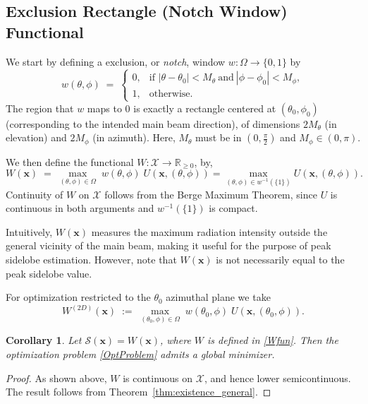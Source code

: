 \documentclass[11pt,letterpaper]{article}
\theoremstyle{definition}
\theoremstyle{plain}
\newtheorem{corollary}[theorem]{Corollary}
\begin{document}
\subsection{Exclusion Rectangle (Notch Window) Functional}
\label{Wsec}

We start by defining a exclusion, or \emph{notch}, window $w:\Omega \to \{0,1\}$  by
\[
w(\theta,\phi) \;=\;
\begin{cases}
0, & \text{if } |\theta-\theta_0|<M_\theta \ \text{and}\ |\phi-\phi_0|<M_\phi,\\[4pt]
1, & \text{otherwise}.
\end{cases}
\]
The region that $w$ maps to $0$ is exactly a rectangle centered at $(\theta_0,\phi_0)$ (corresponding to the intended main beam direction), of dimensions $2M_{\theta}$ (in elevation) and $2M_{\phi}$ (in azimuth). Here, $M_\theta$ must be in $(0, \frac{\pi}{2})$ and $M_\phi \in (0, \pi)$.

We then define the functional $W: \mathcal{X} \to \mathbb{R}_{\geq 0}$, by,
\begin{equation}
W(\mathbf{x}) \;=\; \max_{(\theta,\phi)\in\Omega}\; w(\theta,\phi)\; U\!\left(\mathbf{x},(\theta,\phi)\right) = \max_{(\theta,\phi)\in w^{-1}(\{1\})} U\!\left(\mathbf{x},(\theta,\phi)\right).
\label{Wfun}
\end{equation}
Continuity of $W$ on $\mathcal{X}$ follows from the Berge Maximum Theorem, since $U$ is continuous in both arguments and $w^{-1}(\{1\})$ is compact.

Intuitively, $W(\mathbf{x})$ measures the maximum radiation intensity outside the general vicinity of the main beam, making it useful for the purpose of peak sidelobe estimation. However, note that $W(\mathbf{x})$ is not necessarily equal to the peak sidelobe value. 

For optimization restricted to the $\theta_0$ azimuthal plane we take 
\begin{equation}\label{Wfun2D}
W^{(2D)}(\mathbf{x})\;:=\; \max_{(\theta_0,\phi)\in\Omega}\; w(\theta_0,\phi)\; U\!\left(\mathbf{x},(\theta_0,\phi)\right).
\end{equation}
\begin{corollary}
Let $\mathcal{S}(\mathbf{x}) = W(\mathbf{x})$, where $W$ is defined in \eqref{Wfun}. 
Then the optimization problem \eqref{OptProblem} admits a global minimizer.
\end{corollary}

\begin{proof}
As shown above, $W$ is continuous on $\mathcal{X}$, and hence lower semicontinuous. 
The result follows from Theorem~\ref{thm:existence_general}.
\end{proof}
\end{document}
